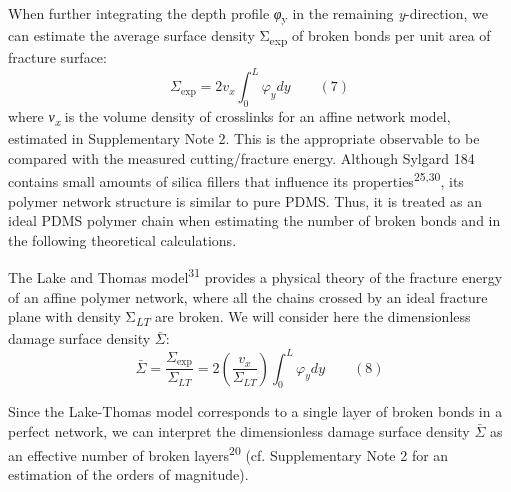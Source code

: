 \documentclass{article}
\begin{document}
When further integrating the depth profile \emph{φ}\textsubscript{y} in the remaining \emph{y}-direction, we can estimate the average surface density Σ\textsubscript{exp} of broken bonds per unit area of fracture surface:
\[ \Sigma_{\mathrm{exp}} = 2 v_x \int_0^L \varphi_y dy \qquad (7) \]
where \emph{ν}\textsubscript{\emph{x}} is the volume density of crosslinks for an affine network model, estimated in Supplementary Note 2. This is the appropriate observable to be compared with the measured cutting/fracture energy. Although Sylgard 184 contains small amounts of silica fillers that influence its properties\textsuperscript{25,30}, its polymer network structure is similar to pure PDMS. Thus, it is treated as an ideal PDMS polymer chain when estimating the number of broken bonds and in the following theoretical calculations.

The Lake and Thomas model\textsuperscript{31} provides a physical theory of the fracture energy of an affine polymer network, where all the chains crossed by an ideal fracture plane with density Σ\textsubscript{\emph{LT}} are broken. We will consider here the dimensionless damage surface density $\bar{\Sigma}$:
\[ \bar{\Sigma} = \frac{\Sigma_{\mathrm{exp}}}{\Sigma_{LT}} = 2\left(\frac{v_x}{\Sigma_{LT}}\right)\int_0^L \varphi_y dy \qquad (8) \]

Since the Lake-Thomas model corresponds to a single layer of broken bonds in a perfect network, we can interpret the dimensionless damage surface density $\bar{\Sigma}$ as an effective number of broken layers\textsuperscript{20} (cf. Supplementary Note 2 for an estimation of the orders of magnitude).
\end{document}

